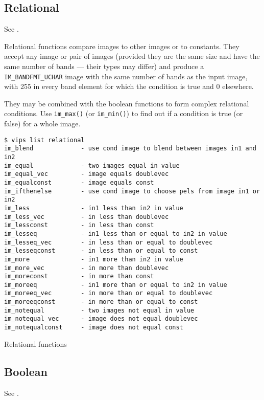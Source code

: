 \subsection{Relational}

See .

Relational functions compare images to other images or to constants. They
accept any image or pair of images (provided they are the same size and
have the same number of bands --- their types may differ) and produce a
\verb+IM_BANDFMT_UCHAR+ image with the same number of bands as the input
image, with 255 in every band element for which the condition is true and
0 elsewhere.

They may be combined with the boolean functions to form complex relational
conditions. Use \verb+im_max()+ (or \verb+im_min()+) to find out if a
condition is true (or false) for a whole image.

\begin{fig2}
\begin{verbatim}
$ vips list relational
im_blend             - use cond image to blend between images in1 and in2
im_equal             - two images equal in value
im_equal_vec         - image equals doublevec
im_equalconst        - image equals const
im_ifthenelse        - use cond image to choose pels from image in1 or in2
im_less              - in1 less than in2 in value
im_less_vec          - in less than doublevec
im_lessconst         - in less than const
im_lesseq            - in1 less than or equal to in2 in value
im_lesseq_vec        - in less than or equal to doublevec
im_lesseqconst       - in less than or equal to const
im_more              - in1 more than in2 in value
im_more_vec          - in more than doublevec
im_moreconst         - in more than const
im_moreeq            - in1 more than or equal to in2 in value
im_moreeq_vec        - in more than or equal to doublevec
im_moreeqconst       - in more than or equal to const
im_notequal          - two images not equal in value
im_notequal_vec      - image does not equal doublevec
im_notequalconst     - image does not equal const
\end{verbatim}
\caption{Relational functions}
\label{fg:relational}
\end{fig2}

\subsection{Boolean}

See .


